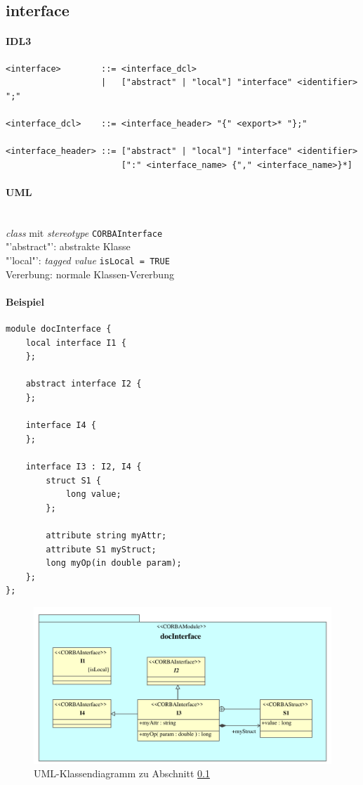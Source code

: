 \documentclass [a4paper,10pt] {scrartcl}
\begin{document}
\cleardoublepage
\subsection{interface}
\label{sec:interface}
\paragraph{IDL3}
\begin{verbatim}
<interface>        ::= <interface_dcl>
                   |   ["abstract" | "local"] "interface" <identifier> ";"

<interface_dcl>    ::= <interface_header> "{" <export>* "};"

<interface_header> ::= ["abstract" | "local"] "interface" <identifier>
                       [":" <interface_name> {"," <interface_name>}*]
\end{verbatim}
\paragraph{UML}~\\
\emph{class} mit \emph{stereotype} \texttt{CORBAInterface}\\
"'abstract"': abstrakte Klasse\\
"'local"': \emph{tagged value} \texttt{isLocal = TRUE}\\
Vererbung: normale Klassen-Vererbung\\
\paragraph{Beispiel}
\begin{verbatim}
module docInterface {
    local interface I1 {
    };

    abstract interface I2 {
    };

    interface I4 {
    };

    interface I3 : I2, I4 {
        struct S1 {
            long value;
        };

        attribute string myAttr;
        attribute S1 myStruct;
        long myOp(in double param);
    };
};
\end{verbatim}
\begin{figure}[!h]
\centerline{\includegraphics[width=1.2 \linewidth]{docInterface}}
\caption{UML-Klassendiagramm zu Abschnitt \ref{sec:interface}}
\label{fig:interface}
\end{figure}
\end{document}
